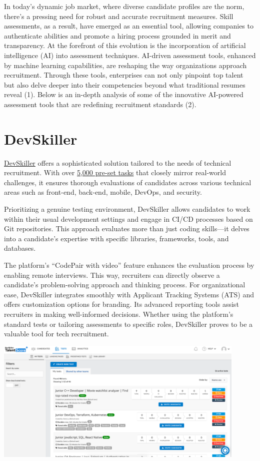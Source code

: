 \documentclass[
]{book}
\begin{document}
In today's dynamic job market, where diverse candidate profiles are the norm, there's a pressing need for robust and accurate recruitment measures. Skill assessments, as a result, have emerged as an essential tool, allowing companies to authenticate abilities and promote a hiring process grounded in merit and transparency. At the forefront of this evolution is the incorporation of artificial intelligence (AI) into assessment techniques. AI-driven assessment tools, enhanced by machine learning capabilities, are reshaping the way organizations approach recruitment. Through these tools, enterprises can not only pinpoint top talent but also delve deeper into their competencies beyond what traditional resumes reveal (1). Below is an in-depth analysis of some of the innovative AI-powered assessment tools that are redefining recruitment standards (2).

\hypertarget{devskiller}{%
\section{DevSkiller}\label{devskiller}}

\href{https://devskiller.com/}{DevSkiller} offers a sophisticated solution tailored to the needs of technical recruitment. With over \href{https://devskiller.com/talentscore/}{5,000 pre-set tasks} that closely mirror real-world challenges, it ensures thorough evaluations of candidates across various technical areas such as front-end, back-end, mobile, DevOps, and security.

Prioritizing a genuine testing environment, DevSkiller allows candidates to work within their usual development settings and engage in CI/CD processes based on Git repositories. This approach evaluates more than just coding skills---it delves into a candidate's expertise with specific libraries, frameworks, tools, and databases.

The platform's ``CodePair with video'' feature enhances the evaluation process by enabling remote interviews. This way, recruiters can directly observe a candidate's problem-solving approach and thinking process. For organizational ease, DevSkiller integrates smoothly with Applicant Tracking Systems (ATS) and offers customization options for branding. Its advanced reporting tools assist recruiters in making well-informed decisions. Whether using the platform's standard tests or tailoring assessments to specific roles, DevSkiller proves to be a valuable tool for tech recruitment.

\includegraphics[width=4.73958in,height=\textheight]{devskiller picc.png}
\end{document}
